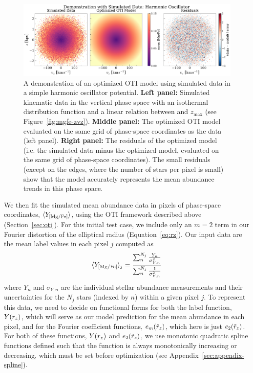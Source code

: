 \begin{figure}[t!]
\begin{center}
\includegraphics[width=\textwidth]{sho-data-model.pdf}
\end{center}
\caption{%
A demonstration of an optimized OTI model using simulated data in a simple harmonic
oscillator potential.
\textbf{Left panel:} Simulated kinematic data in the vertical phase space with an
isothermal distribution function and a linear relation between  and
$z_{\textrm{max}}$ (see Figure~\ref{fig:mgfe-zvz}).
\textbf{Middle panel:} The optimized OTI model evaluated on the same grid of phase-space
coordinates as the data (left panel).
\textbf{Right panel:} The residuals of the optimized model (i.e. the simulated data
minus the optimized model, evaluated on the same grid of phase-space coordinates).
The small residuals (except on the edges, where the number of stars per pixel is small)
show that the model accurately represents the mean abundance trends in this phase space.
\label{fig:sho-data-model}
}
\end{figure}

We then fit the simulated mean abundance data in pixels of phase-space coordinates,
$\langle Y_{{[\mathrm{Mg}/\mathrm{Fe}]}} \rangle$, using the OTI framework described above
(Section~\ref{sec:oti}).
For this initial test case, we include only an $m=2$ term in our Fourier distortion of
the elliptical radius (Equation~\ref{eq:rz}).
Our input data are the mean label values in each pixel $j$ computed as
\begin{equation}
    \langle Y_{{[\mathrm{Mg}/\mathrm{Fe}]}} \rangle_j =
        \frac{\sum_n^{N_j} \frac{Y_n}{\sigma_{Y,n}^2}}{\sum_n^{N_j} \frac{1}{\sigma_{Y,n}^2}} \label{eq:mean-abun}
\end{equation}
where $Y_n$ and $\sigma_{Y, n}$ are the individual stellar abundance measurements and
their uncertainties for the $N_j$ stars (indexed by $n$) within a given pixel $j$.
To represent this data, we need to decide on functional forms for both the label
function, $Y(r_z)$, which will serve as our model prediction for the mean abundance in
each pixel, and for the Fourier coefficient functions, $e_m(\tilde{r}_z)$, which here is just
$e_2(\tilde{r}_z)$.
For both of these functions, $Y(r_z)$ and $e_2(\tilde{r}_z)$, we use monotonic quadratic spline
functions defined such that the function is always monotonically increasing or
decreasing, which must be set before optimization (see
Appendix~\ref{sec:appendix-spline}).

